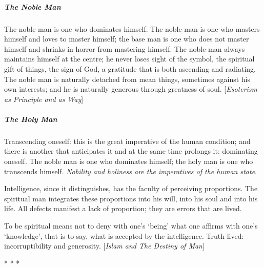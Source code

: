 \subparagraph{The Noble Man}
\begin{quotex}
The noble man is one who dominates himself. The noble man is one who masters himself and loves to master himself; the base man is one who does not master himself and shrinks in horror from mastering himself. The noble man always maintains himself at the centre; he never loses sight of the symbol, the spiritual gift of things, the sign of God, a gratitude that is both ascending and radiating. The noble man is naturally detached from mean things, sometimes against his own interests; and he is naturally generous through greatness of soul. [\emph{Esoterism as Principle and as Way}] 

\end{quotex}
\subparagraph{The Holy Man}
\begin{quotex}
Transcending oneself: this is the great imperative of the human condition; and there is another that anticipates it and at the same time prolongs it: dominating oneself. The noble man is one who dominates himself; the holy man is one who transcends himself. \emph{Nobility and holiness are the imperatives of the human state}.

Intelligence, since it distinguishes, has the faculty of perceiving proportions. The spiritual man integrates these proportions into his will, into his soul and into his life. All defects manifest a lack of proportion; they are errors that are lived.

To be spiritual means not to deny with one's `being' what one affirms with one's `knowledge', that is to say, what is accepted by the intelligence. Truth lived: incorruptibility and generosity. [\emph{Islam and The Destiny of Man}] 

\end{quotex}



\begin{center}* * *\end{center}

